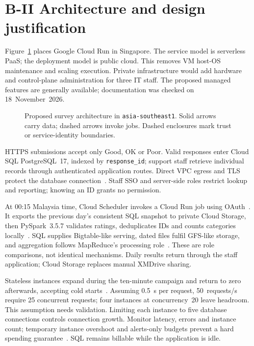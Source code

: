 \section*{B-II Architecture and design justification}

Figure~\ref{fig:architecture} places Google Cloud Run in Singapore. The service model is serverless PaaS; the deployment model is public cloud. This removes VM host-OS maintenance and scaling execution. Private infrastructure would add hardware and control-plane administration for three IT staff. The proposed managed features are generally available; documentation was checked on 18~November~2026.

\begin{figure}[tbp]
\centering
\resizebox{\linewidth}{!}{}
\caption{Proposed survey architecture in \texttt{asia-southeast1}. Solid arrows carry data; dashed arrows invoke jobs. Dashed enclosures mark trust or service-identity boundaries.}
\label{fig:architecture}
\end{figure}

HTTPS submissions accept only Good, OK or Poor. Valid responses enter Cloud SQL PostgreSQL~17, indexed by \texttt{response\_id}; support staff retrieve individual records through authenticated application routes. Direct VPC egress and TLS protect the database connection~\cite{connection}. Staff SSO and server-side roles restrict lookup and reporting; knowing an ID grants no permission.

At 00:15 Malaysia time, Cloud Scheduler invokes a Cloud Run job using OAuth~\cite{schedule}. It exports the previous day's consistent SQL snapshot to private Cloud Storage, then PySpark~3.5.7 validates ratings, deduplicates IDs and counts categories locally~\cite{storage,spark}. SQL supplies Bigtable-like serving, dated files fulfil GFS-like storage, and aggregation follows MapReduce's processing role~\cite{bigtable,gfs,mapreduce}. These are role comparisons, not identical mechanisms. Daily results return through the staff application; Cloud Storage replaces manual XMDrive sharing.

Stateless instances expand during the ten-minute campaign and return to zero afterwards, accepting cold starts~\cite{scaling}. Assuming 0.5~s per request, 50~requests/s require 25 concurrent requests; four instances at concurrency~20 leave headroom. This assumption needs validation. Limiting each instance to five database connections controls connection growth. Monitor latency, errors and instance count; temporary instance overshoot and alerts-only budgets prevent a hard spending guarantee~\cite{scaling,budgets}. SQL remains billable while the application is idle.

